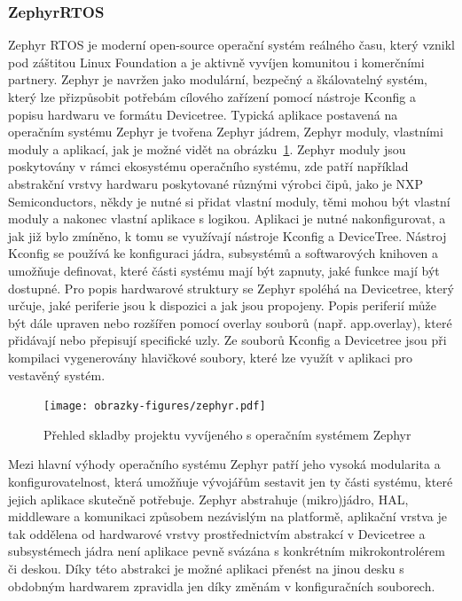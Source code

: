 \subsubsection{ZephyrRTOS}
\label{zephyr_rtos}
Zephyr RTOS je moderní open-source operační systém reálného času, který vznikl pod záštitou Linux Foundation a je aktivně vyvíjen komunitou i komerčními partnery. Zephyr je navržen jako modulární, bezpečný a škálovatelný systém, který lze přizpůsobit potřebám cílového zařízení pomocí nástroje Kconfig a popisu hardwaru ve formátu Devicetree. Typická aplikace postavená na operačním systému Zephyr je tvořena Zephyr jádrem, Zephyr moduly, vlastními moduly a aplikací, jak je možné vidět na obrázku~\ref{fig:zephyr}. Zephyr moduly jsou poskytovány v rámci ekosystému operačního systému, zde patří například abstrakční vrstvy hardwaru poskytované různými výrobci čipů, jako je NXP Semiconductors, někdy je nutné si přidat vlastní moduly, těmi mohou být vlastní moduly a nakonec vlastní aplikace s logikou. Aplikaci je nutné nakonfigurovat, a jak již bylo zmíněno, k tomu se využívají nástroje Kconfig a DeviceTree. Nástroj Kconfig se používá ke konfiguraci jádra, subsystémů a softwarových knihoven a umožňuje  definovat, které části systému mají být zapnuty, jaké funkce mají být dostupné. Pro popis hardwarové struktury se Zephyr spoléhá na Devicetree, který určuje, jaké periferie jsou k dispozici a jak jsou propojeny. Popis periferií může být dále upraven nebo rozšířen pomocí overlay souborů (např. app.overlay), které přidávají nebo přepisují specifické uzly. Ze souborů Kconfig a Devicetree jsou při kompilaci vygenerovány hlavičkové soubory, které lze využít v aplikaci pro vestavěný systém. \cite{zephyr_doc_modules, embedded_summit_configure_zephyr}

\begin{figure}[h]
    \centering
    \texttt{[image: obrazky-figures/zephyr.pdf]}
    
    \caption{Přehled skladby projektu vyvíjeného s operačním systémem Zephyr \cite{embedded_summit_configure_zephyr}}
    \label{fig:zephyr}
\end{figure}

Mezi hlavní výhody operačního systému Zephyr patří jeho vysoká modularita a konfigurovatelnost, která umožňuje vývojářům sestavit jen ty části systému, které jejich aplikace skutečně potřebuje. Zephyr abstrahuje (mikro)jádro, HAL, middleware a komunikaci způsobem nezávislým na platformě, aplikační vrstva je tak oddělena od hardwarové vrstvy prostřednictvím abstrakcí v Devicetree a subsystémech jádra není aplikace pevně svázána s konkrétním mikrokontrolérem či deskou. Díky této abstrakci je možné aplikaci přenést na jinou desku s obdobným hardwarem zpravidla jen díky změnám v konfiguračních souborech. \cite{zephyr_advantages}

